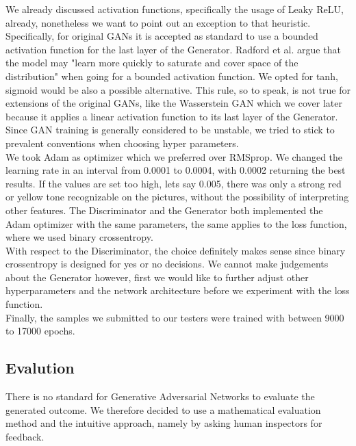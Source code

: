     We already discussed activation functions, specifically the usage of Leaky ReLU, already, nonetheless we want to point out an exception to that heuristic. Specifically, for original GANs it is accepted as standard to use a bounded activation function for the last layer of the Generator. Radford et al. \cite{radford2015unsupervised} argue that the model may "learn more quickly to saturate and cover space of the distribution" when going for a bounded activation function. We opted for tanh, sigmoid would be also a possible alternative. This rule, so to speak, is not true for extensions of the original GANs, like the Wasserstein GAN\cite{arjovsky2017wasserstein} which we cover later because it applies a linear activation function to its last layer of the Generator. Since GAN training is generally considered to be unstable, we tried to stick to prevalent conventions when choosing hyper parameters. \\
    We took Adam as optimizer which we preferred over RMSprop. We changed the learning rate in an interval from 0.0001 to 0.0004, with 0.0002 returning the best results. If the values are set too high, lets say 0.005, there was only a strong red or yellow tone recognizable on the pictures, without the possibility of interpreting other features. The Discriminator and the Generator both implemented the Adam optimizer with the same parameters, the same applies to the loss function, where we used binary crossentropy. \\
    With respect to the Discriminator, the choice definitely makes sense since binary crossentropy is designed for yes or no decisions. We cannot make judgements about the Generator however, first we would like to further adjust other hyperparameters and the network architecture before we experiment with the loss function.\\
    Finally, the samples we submitted to our testers were trained with between 9000 to 17000 epochs.

    \subsection{Evalution}

    There is no standard for Generative Adversarial Networks to evaluate the generated outcome. We therefore decided to use a mathematical evaluation method and the intuitive approach, namely by asking human inspectors for feedback. 

